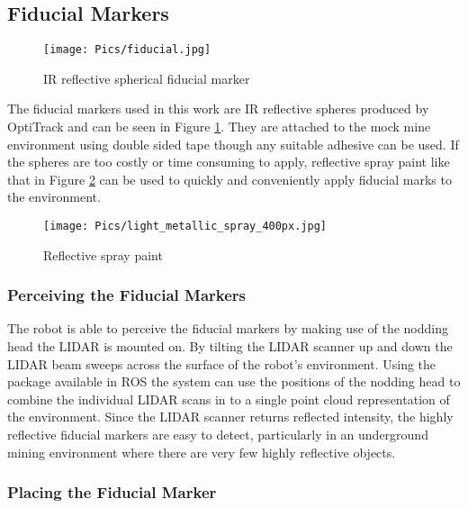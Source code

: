 \subsection{Fiducial Markers}

\begin{figure}
    \centering
    \texttt{[image: Pics/fiducial.jpg]}
    \caption{IR reflective spherical fiducial marker}
    \label{fig:fiducial}
\end{figure}

The fiducial markers used in this work are IR reflective spheres produced by OptiTrack and can be seen in Figure \ref{fig:fiducial}. They are attached to the mock mine environment using double sided tape though any suitable adhesive can be used. If the spheres are too costly or time consuming to apply, reflective spray paint like that in Figure \ref{fig:irspray} can be used to quickly and conveniently apply fiducial marks to the environment.\\

\begin{figure}
    \centering
    \texttt{[image: Pics/light\_metallic\_spray\_400px.jpg]}
    \caption{Reflective spray paint \cite{spraypaint}}
    \label{fig:irspray}
\end{figure}

\subsubsection{Perceiving the Fiducial Markers}

The robot is able to perceive the fiducial markers by making use of the nodding head the LIDAR is mounted on. By tilting the LIDAR scanner up and down the LIDAR beam sweeps across the surface of the robot's environment. Using the  package available in ROS the system can use the positions of the nodding head to combine the individual LIDAR scans in to a single point cloud representation of the environment. Since the LIDAR scanner returns reflected intensity, the highly reflective fiducial markers are easy to detect, particularly in an underground mining environment where there are very few highly reflective objects.\\

\subsubsection{Placing the Fiducial Marker}

